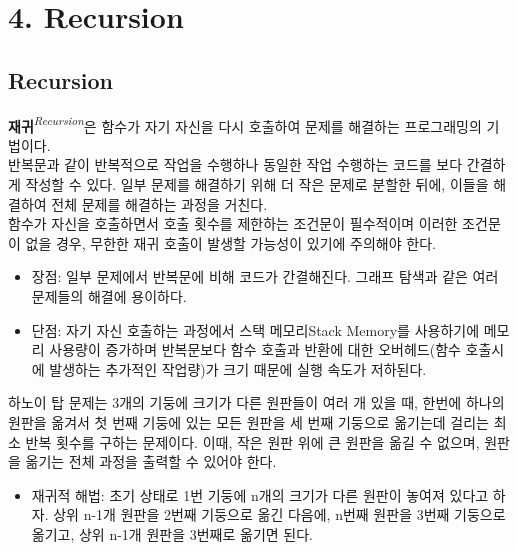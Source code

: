 \section[4. Recursion - {\it 재귀}]{4. Recursion}

\subsection{Recursion}

\textbf{재귀}\textit{\textsuperscript{Recursion}}은 함수가 자기 자신을 다시 호출하여 문제를 해결하는 프로그래밍의 기법이다.\\
반복문과 같이 반복적으로 작업을 수행하나 동일한 작업 수행하는 코드를 보다 간결하게 작성할 수 있다. 일부 문제를 해결하기 위해 더 작은 문제로 분할한 뒤에, 이들을 해결하여 전체 문제를 해결하는 과정을 거친다.\\
함수가 자신을 호출하면서 호출 횟수를 제한하는 조건문이 필수적이며 이러한 조건문이 없을 경우, 무한한 재귀 호출이 발생할 가능성이 있기에 주의해야 한다.
\begin{itemize}
\item 장점: 일부 문제에서 반복문에 비해 코드가 간결해진다. 그래프 탐색과 같은 여러 문제들의 해결에 용이하다.
\item 단점: 자기 자신 호출하는 과정에서 스택 메모리Stack Memory를 사용하기에 메모리 사용량이 증가하며 반복문보다 함수 호출과 반환에 대한 오버헤드(함수 호출시에 발생하는 추가적인 작업량)가 크기 때문에 실행 속도가 저하된다.
\end{itemize}

하노이 탑 문제는 3개의 기둥에 크기가 다른 원판들이 여러 개 있을 때, 한번에 하나의 원판을 옮겨서 첫 번째 기둥에 있는 모든 원판을 세 번째 기둥으로 옮기는데 걸리는 최소 반복 횟수를 구하는 문제이다. 이때, 작은 원판 위에 큰 원판을 옮길 수 없으며, 원판을 옮기는 전체 과정을 출력할 수 있어야 한다.
\begin{itemize}
\item 재귀적 해법: 초기 상태로 1번 기둥에 n개의 크기가 다른 원판이 놓여져 있다고 하자. 상위 n-1개 원판을 2번째 기둥으로 옮긴 다음에, n번째 원판을 3번째 기둥으로 옮기고, 상위 n-1개 원판을 3번째로 옮기면 된다.
\end{itemize}

